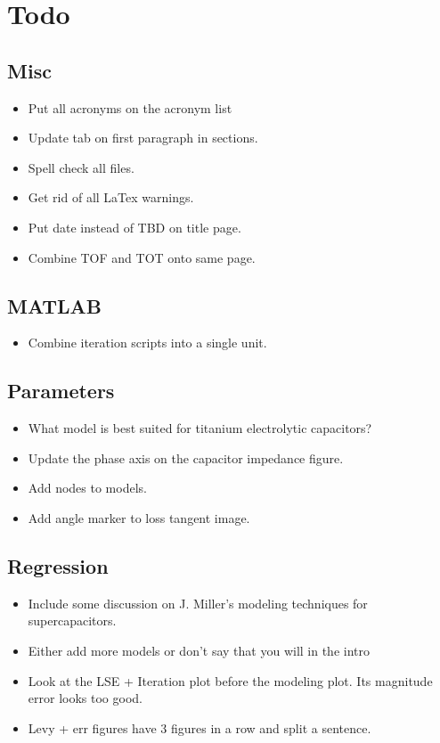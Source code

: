 \section{Todo}

\subsection{Misc}
\begin{itemize}
    \item Put all acronyms on the acronym list
    \item Update tab on first paragraph in sections.
    \item Spell check all files.
    \item Get rid of all LaTex warnings.
    \item Put date instead of TBD on title page.
    \item Combine TOF and TOT onto same page.
\end{itemize}

\subsection{MATLAB}
\begin{itemize}
    \item Combine iteration scripts into a single unit.
\end{itemize}

\subsection{Parameters}
\begin{itemize}
    \item What model is best suited for titanium electrolytic capacitors?
    \item Update the phase axis on the capacitor impedance figure.
    \item Add nodes to models.
    \item Add angle marker to loss tangent image.
\end{itemize}

\subsection{Regression}
\begin{itemize}
    \item Include some discussion on J. Miller's modeling techniques for supercapacitors.
    \item Either add more models or don't say that you will in the intro
    \item Look at the LSE + Iteration plot before the modeling plot. Its magnitude error looks too good.
    \item Levy + err figures have 3 figures in a row and split a sentence.
\end{itemize}

